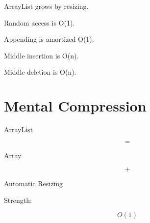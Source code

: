 \documentclass[11pt,a4paper]{book}
\begin{document}

\begin{rosettarule}

ArrayList grows by resizing.

\end{rosettarule}


\begin{rosettarule}

Random access is O(1).

\end{rosettarule}


\begin{rosettarule}

Appending is amortized O(1).

\end{rosettarule}


\begin{rosettarule}

Middle insertion is O(n).

\end{rosettarule}


\begin{rosettarule}

Middle deletion is O(n).

\end{rosettarule}


\section{Mental Compression}

ArrayList

\[
=
\]

Array

\[
+
\]

Automatic Resizing


Strength:

\[
O(1)
\]
\end{document}
